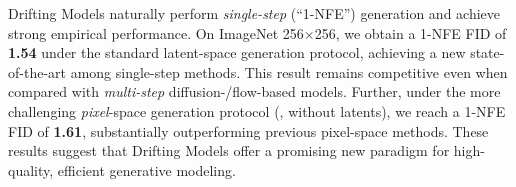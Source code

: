 Drifting Models naturally perform \textit{single-step} (\mbox{``1-NFE''}) generation and achieve strong empirical performance.
On ImageNet 256$\times$256, we obtain a 1-NFE
FID of \textbf{1.54} under the standard latent-space generation protocol, achieving a new state-of-the-art among single-step methods. This result remains competitive even when compared with \textit{multi-step} diffusion-/flow-based models.
Further, under the more challenging \textit{pixel}-space generation protocol (\ie, without latents), we reach a 1-NFE FID of \textbf{1.61}, substantially outperforming previous pixel-space methods. 
These results suggest that Drifting Models offer a promising new paradigm for high-quality, efficient generative modeling.
